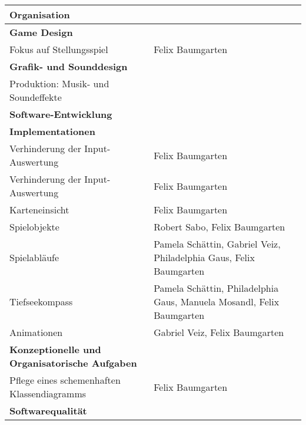 \begin{tabular}{|p{8cm}|p{10cm}|}
\hline
\textbf{Organisation} &  \\ \hline
\textbf{Game Design} &  \\ \hline
Fokus auf Stellungsspiel & Felix Baumgarten \\ \hline
\textbf{Grafik- und Sounddesign} & \\ \hline
Produktion: Musik- und Soundeffekte & \\ \hline
\textbf{Software-Entwicklung} & \\ \hline
\textbf{Implementationen} & \\ \hline
Verhinderung der Input-Auswertung & Felix Baumgarten \\ \hline
Verhinderung der Input-Auswertung & Felix Baumgarten \\ \hline
Karteneinsicht & Felix Baumgarten \\ \hline
Spielobjekte & Robert Sabo, Felix Baumgarten \\ \hline
Spielabläufe & Pamela Schättin, Gabriel Veiz, Philadelphia Gaus, Felix Baumgarten \\ \hline
Tiefseekompass & Pamela Schättin, Philadelphia Gaus, Manuela Mosandl, Felix Baumgarten \\ \hline
Animationen & Gabriel Veiz, Felix Baumgarten \\ \hline
\textbf{Konzeptionelle und Organisatorische Aufgaben} & \\ \hline
Pflege eines schemenhaften Klassendiagramms  & Felix Baumgarten \\ \hline
\textbf{Softwarequalität} & \\
\hline
\end{tabular}